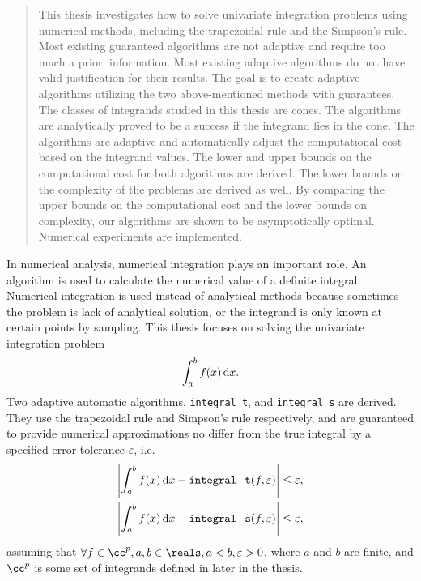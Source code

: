\documentclass{iitthesis}
\theoremstyle{definition}
\theoremstyle{remark}
\begin{document}
\begin{abstract}           %
\par This thesis investigates how to solve univariate integration problems using numerical methods, including the trapezoidal rule and the Simpson's rule. Most existing guaranteed algorithms are not adaptive and require too much a priori information. Most existing adaptive algorithms do not have valid justification for their results. The goal is to create adaptive algorithms utilizing the two above-mentioned methods with guarantees. The classes of integrands studied in this thesis are cones. The algorithms are analytically proved to be a success if the integrand lies in the cone. The algorithms are adaptive and automatically adjust the computational cost based on the integrand values. The lower and upper bounds on the computational cost for both algorithms are derived. The lower bounds on the complexity of the problems are derived as well. By comparing the upper bounds on the computational cost and the lower bounds on complexity, our algorithms are shown to be asymptotically optimal. Numerical experiments are implemented.
\end{abstract}


\textpages     %


In numerical analysis, numerical integration plays an important role. An algorithm is used to calculate the numerical value of a definite integral. Numerical integration is used instead of analytical methods because sometimes the problem is lack of analytical solution, or the integrand is only known at certain points by sampling. This thesis focuses on solving the univariate integration problem
\begin{equation}\label{integral}
    \int_{a}^{b}f(x)\,\textup{d}x.
\end{equation}
Two adaptive automatic algorithms, {\tt integral\_t}, and {\tt integral\_s} are derived. They use the trapezoidal rule and Simpson's rule respectively, and are guaranteed to provide numerical approximations no differ from the true integral by a specified error tolerance $\varepsilon$, i.e.
\begin{align}\label{approx}
      \left|\int_{a}^{b}f(x)\,\textup{d}x-{\tt integral\_t}(f,\varepsilon)\right|\leq \varepsilon,& \\
      \left|\int_{a}^{b}f(x)\,\textup{d}x-{\tt integral\_s}(f,\varepsilon)\right|\leq \varepsilon,&
\end{align}
assuming that $\forall f \in \cc^{p}, a,b\in\reals, a<b, \varepsilon>0$, where $a$ and $b$ are finite, and $\cc^{p}$ is some set of integrands defined in later in the thesis.
\end{document}
